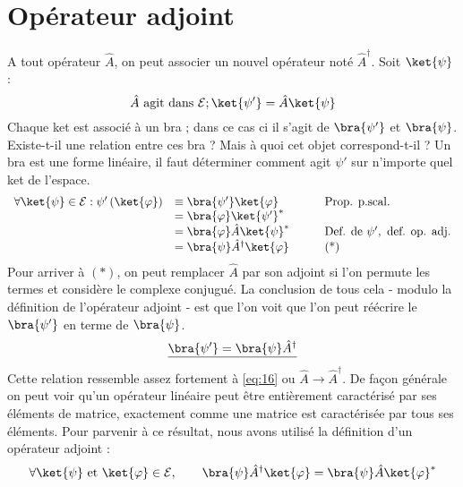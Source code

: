 \section{Opérateur adjoint}
A tout opérateur $\hat{A}$, on peut associer un nouvel opérateur noté $\hat{A}^\dagger$. 
Soit $\ket{\psi}$ :
\begin{equation}
\hat{A} \text{ agit dans }\mathcal{E} ; \ket{\psi'} = \hat{A}\ket{\psi}
\label{eq:16}
\end{equation}
Chaque ket est associé à un bra ; dans ce cas ci il s'agit de $\bra{\psi'}$ et
$\bra{\psi}$. Existe-t-il une relation entre ces bra ? Mais à quoi cet objet 
correspond-t-il ? Un bra est une forme linéaire, il faut déterminer comment 
agit $\psi'$ sur n'importe quel ket de l'espace.
\begin{equation}
\begin{array}{lll}
\forall \ket{\psi} \in \mathcal{E} : \psi'\left(\ket{\varphi}\right) &\equiv 
\bra{\psi'}\ket{\varphi} & \qquad \text{Prop. p.scal.}\\
&= \bra{\varphi}\ket{\psi'}^*\\
&= \bra{\varphi}\hat{A}\ket{\psi}^* & \qquad \text{Def. de }\psi', \text{ def. op. adj.}\\
&= \bra{\psi}\hat{A}^\dagger\ket{\varphi}& \qquad \text{(*)}
\end{array}
\end{equation}
Pour arriver à $(*)$, on peut remplacer $\hat{A}$ par son adjoint si l'on 
permute les termes et considère le complexe conjugué.
La conclusion de tous cela - modulo la définition de l'opérateur adjoint - est 
que l'on voit que l'on peut réécrire le $\bra{\psi'}$ en terme de $\bra{\psi}$.
\begin{equation}
\underline{\bra{\psi'} = \bra{\psi}\hat{A}^\dagger}
\end{equation}
Cette relation ressemble assez fortement à \autoref{eq:16} ou $\hat{A}\rightarrow
\hat{A}^\dagger$.
De façon générale on peut voir qu'un opérateur linéaire peut être entièrement 
caractérisé par ses éléments de matrice, exactement comme une matrice est 
caractérisée par tous ses éléments. Pour parvenir à ce résultat, nous avons 
utilisé la définition d'un opérateur adjoint :
\begin{equation}
\forall \ket{\psi} \text{ et } \ket{\varphi} \in \mathcal{E},\qquad 
\bra{\psi}\hat{A}^\dagger \ket{\varphi} = \bra{\psi}\hat{A}\ket{\varphi}^*
\end{equation}

